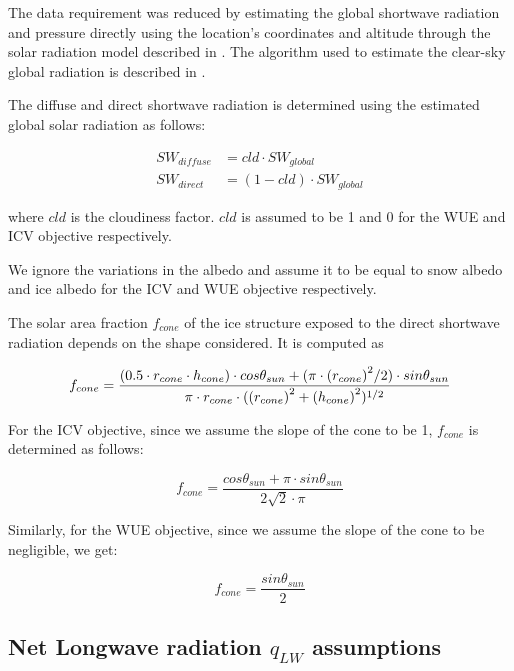 \documentclass[tc, manuscript]{copernicus}
\begin{document}
The data requirement was reduced by estimating the global shortwave radiation and pressure directly using the
location's coordinates and altitude through the solar radiation model described in
\citet{holmgrenPvlibPythonPython2018}. The algorithm used to estimate the clear-sky global radiation is
described in \citet{ineichenBroadbandSimplifiedVersion2008}.  

The diffuse and direct shortwave radiation is determined using the estimated global solar radiation as follows:

\begin{equation}
\begin{split}
  SW_{diffuse} &= cld \cdot SW_{global}\\
  SW_{direct} &= (1-cld) \cdot SW_{global}
\end{split}
\end{equation}

where $cld$ is the cloudiness factor. $cld$ is assumed to be 1 and 0 for the WUE and ICV objective
respectively.

We ignore the variations in the albedo and assume it to be equal to snow albedo and ice albedo for the ICV and
WUE objective respectively.

The solar area fraction $f_{cone}$ of the ice structure exposed to the direct shortwave radiation depends on the
shape considered. It is computed as

\begin{equation}
		f_{cone} =\frac{(0.5 \cdot r_{cone} \cdot h_{cone}) \cdot cos \theta_{sun} +(\pi \cdot
			{(r_{cone})}^2/2) \cdot sin \theta_{sun} }{\pi \cdot r_{cone} \cdot ({(r_{cone})}^2+{(h_{cone})}^2)^{1/2}}\\
\end{equation}

For the ICV objective, since we assume the slope of the cone to be 1, $f_{cone}$ is determined as follows:

\begin{equation}
		f_{cone} =\frac{ cos \theta_{sun} + \pi \cdot sin \theta_{sun} }{2\sqrt{2} \cdot \pi }
\end{equation}

Similarly, for the WUE objective, since we assume the slope of the cone to be negligible, we get:

\begin{equation}
		f_{cone} =\frac{ sin \theta_{sun} }{2 }
\end{equation}

\subsection{Net Longwave radiation \texorpdfstring{$q_{LW}$}{Lg} assumptions} \label{sec:LW}
\end{document}
